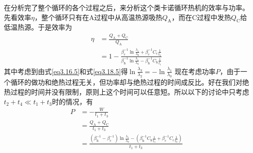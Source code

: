 在分析完了整个循环的各个过程之后，来分析这个类卡诺循环热机的效率与功率。先看效率$\eta$，整个循环只有在A过程中从高温热源吸热$Q_{\mathrm{A}}$，而在C过程中发热$Q_{\mathrm{C}}$给低温热源。于是效率为
\begin{equation}
    \begin{split}
        \eta &= \frac{Q_{\mathrm{A}} + Q_{\mathrm{C}}}{Q_{\mathrm{A}}}\\ 
        &=1- \frac{\beta_{\mathrm{c}}^{-1} \ln{\frac{\lambda_1}{\lambda_0}} + \beta_{\mathrm{c}}^{-1} C_{\mathrm{c}} \frac{1}{t_3}}{\beta_{\mathrm{h}}^{-1} \ln{\frac{\lambda_1}{\lambda_0}} - \beta_{\mathrm{h}}^{-1} C_{\mathrm{h}} \frac{1}{t_1}}
    \end{split}
    \label{3.20}
\end{equation}
其中考虑到由式\eqref{eq3.16.5}和式\eqref{eq3.18.5}得$\ln{\frac{\lambda_3}{\lambda_2}}=-\ln{\frac{\lambda_1}{\lambda_0}}$
现在考虑功率$P$，由于一个循环的做功和绝热过程无关，但功率却与绝热过程的时间成反比。好在我们对绝热过程的时间并没有限制，原则上这个时间可以任意短。所以以下的讨论中只考虑$t_2 + t_4 \ll t_1 + t_3$时的情况，有
\begin{equation}
    \begin{split}
        P&=-\frac{W}{t_1+t_3}\\
        &=\frac{Q_{\mathrm{A}} + Q_{\mathrm{C}}}{t_1+t_3}\\
        &=\frac{\left(\beta_{\mathrm{h}}^{-1}-\beta_{\mathrm{c}}^{-1}\right) \ln{\frac{\lambda_1}{\lambda_0}} - \left(\beta_{\mathrm{h}}^{-1} C_{\mathrm{h}} \frac{1}{t_1} + \beta_{\mathrm{c}}^{-1} C_{\mathrm{c}} \frac{1}{t_3}\right)}{t_1+t_3}
    \end{split}
    \label{eq3.35}
\end{equation}


